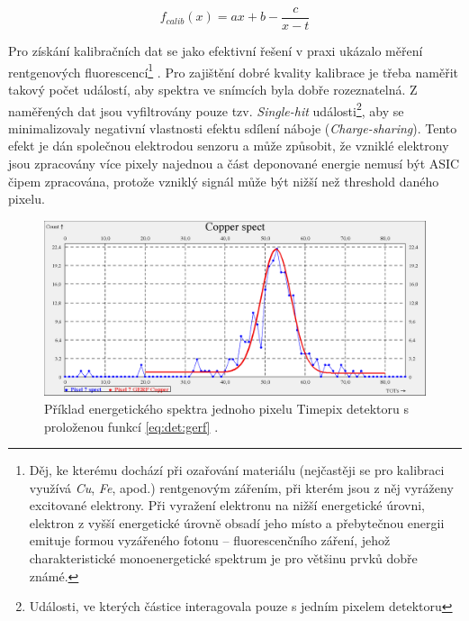 \begin{equation}\label{eq:det:energyCalib}
	f_{calib}(x) = ax + b - \frac{c}{x-t}
\end{equation}

Pro získání kalibračních dat se jako efektivní řešení v praxi ukázalo měření rentgenových fluorescencí\footnote{Děj, ke kterému dochází při ozařování materiálu (nejčastěji se pro kalibraci využívá \textit{Cu}, \textit{Fe},  apod.) rentgenovým zářením, při kterém jsou z něj vyráženy excitované elektrony. Při vyražení elektronu na nižší energetické úrovni, elektron z vyšší energetické úrovně obsadí jeho místo a přebytečnou energii emituje formou vyzářeného fotonu -- fluorescenčního záření, jehož charakteristické monoenergetické spektrum je pro většinu prvků dobře známé.} \cite{Jakubek-radiography_and_charge_sharing}. Pro zajištění dobré kvality kalibrace je třeba naměřit takový počet událostí, aby spektra ve snímcích byla dobře rozeznatelná. Z naměřených dat jsou vyfiltrovány pouze tzv. \textit{Single-hit} události\footnote{Události, ve kterých částice interagovala pouze s jedním pixelem detektoru}, aby se minimalizovaly negativní vlastnosti efektu sdílení náboje (\textit{Charge-sharing}). Tento efekt je dán společnou elektrodou senzoru a může způsobit, že  vzniklé elektrony jsou zpracovány více pixely najednou a část deponované energie nemusí být ASIC čipem zpracována, protože vzniklý signál může být nižší než threshold daného pixelu.

\begin{figure}[th]
	\begin{center}
		\includegraphics[width=15cm]{figures/calib_gerf.png}
		\caption{Příklad energetického spektra jednoho pixelu Timepix detektoru s proloženou funkcí \ref{eq:det:gerf} \cite{BegeraBcThesis2016}.}
		\label{fig:det:calib:gerf}
	\end{center}
\end{figure}

